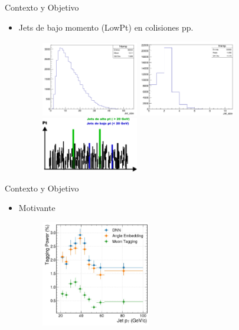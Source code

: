 \documentclass{beamer}
\begin{document}
\begin{frame}{Contexto y Objetivo}
  \begin{itemize}
    \item Jets de bajo momento (LowPt) en colisiones pp.
    \begin{figure}
      \centering
      \includegraphics[width=0.4\textwidth]{njetl.png}
      \hfill
      \includegraphics[width=0.4\textwidth]{njeth.png}
      \hfill
      \includegraphics[width=0.4\textwidth]{lowpt.png}
    \end{figure}
  \end{itemize}
\end{frame}

\begin{frame}{Contexto y Objetivo}
  \begin{itemize}
    \item Motivante
    \begin{figure}
      \centering
      \includegraphics[width=0.45\textwidth]{motiv.png}
    \end{figure}
  \end{itemize}
\end{frame}
\end{document}
